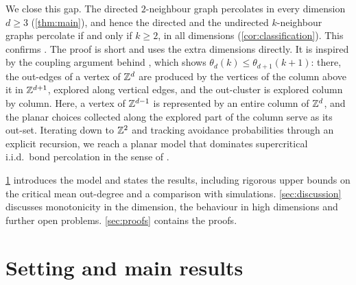 \documentclass[11pt,letterpaper]{article}
\begin{document}
We close this gap. The directed $2$-neighbour graph percolates in every dimension $d\ge3$ (\cref{thm:main}), and hence the directed and the undirected $k$-neighbour graphs percolate if and only if $k\ge2$, in all dimensions (\cref{cor:classification}). This confirms \cite[Conjecture~3.1]{JKLT25}. The proof is short and uses the extra dimensions directly. It is inspired by the coupling argument behind \cite[Theorem~2.3]{JKLT25}, which shows $\theta_d(k)\le\theta_{d+1}(k+1)$: there, the out-edges of a vertex of $\mathbb Z^d$ are produced by the vertices of the column above it in $\mathbb Z^{d+1}$, explored along vertical edges, and the out-cluster is explored column by column. Here, a vertex of $\mathbb Z^{d-1}$ is represented by an entire column of $\mathbb Z^d$, and the planar choices collected along the explored part of the column serve as its out-set. Iterating down to $\mathbb Z^2$ and tracking avoidance probabilities through an explicit recursion, we reach a planar model that dominates supercritical i.i.d.\ bond percolation in the sense of \cite{BJKLRT25}.

\cref{sec:setting} introduces the model and states the results, including rigorous upper bounds on the critical mean out-degree and a comparison with simulations. \cref{sec:discussion} discusses monotonicity in the dimension, the behaviour in high dimensions and further open problems. \cref{sec:proofs} contains the proofs.

\section{Setting and main results}\label{sec:setting}
\end{document}
